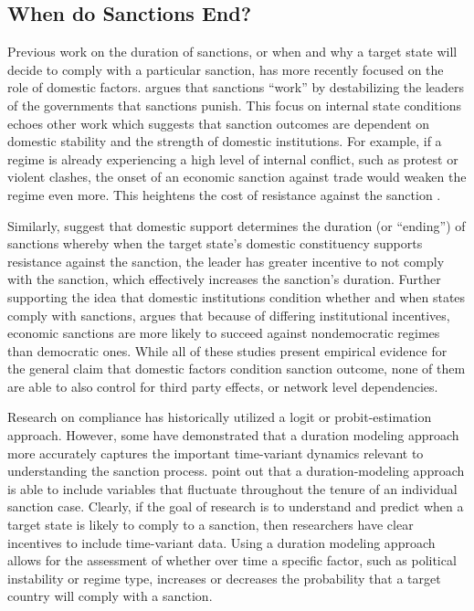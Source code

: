 \subsection*{When do Sanctions End?}
\label{lit}

Previous work on the duration of sanctions, or when and why a target state will decide to comply with a particular sanction, has more recently focused on the role of domestic factors. \cite{marinov2005} argues that sanctions ``work'' by destabilizing the leaders of the governments that sanctions punish. This focus on internal state conditions echoes other work which suggests that sanction outcomes are dependent on domestic stability and the strength of domestic institutions. For example, if a regime is already experiencing a high level of internal conflict, such as protest or violent clashes, the onset of an economic sanction against trade would weaken the regime even more. This heightens the cost of resistance against the sanction \citep{dashti1997}. 

Similarly, \citep{dorussen2001} suggest that domestic support determines the duration (or ``ending'') of sanctions whereby when the target state's domestic constituency supports resistance against the sanction, the leader has greater incentive to not comply with the sanction, which effectively increases the sanction's duration. Further supporting the idea that domestic institutions condition whether and when states comply with sanctions, \cite{lektzian2007} argues that because of differing institutional incentives, economic sanctions are more likely to succeed against nondemocratic regimes than democratic ones. While all of these studies present empirical evidence for the general claim that domestic factors condition sanction outcome, none of them are able to also control for third party effects, or network level dependencies. 

Research on compliance has historically utilized a logit or probit-estimation approach. However, some have demonstrated that a duration modeling approach more accurately captures the important time-variant dynamics relevant to understanding the sanction process. \cite{bolks2000} point out that a duration-modeling approach is able to include variables that fluctuate throughout the tenure of an individual sanction case. Clearly, if the goal of research is to understand and predict when a target state is likely to comply to a sanction, then researchers have clear incentives to include time-variant data. Using a duration modeling approach allows for the assessment of whether over time a specific factor, such as political instability or regime type, increases or decreases the probability that a target country will comply with a sanction.

